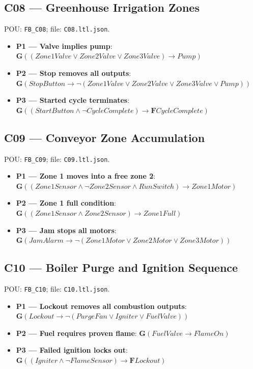 \subsection*{C08 --- Greenhouse Irrigation Zones}
\noindent POU: \texttt{FB\_C08}; file: \texttt{C08.ltl.json}.
\begin{small}
\begin{itemize}
\item \textbf{P1 --- Valve implies pump}: $\mathbf{G}((Zone1Valve \vee Zone2Valve \vee Zone3Valve) \rightarrow Pump)$
\item \textbf{P2 --- Stop removes all outputs}: $\mathbf{G}(StopButton \rightarrow \neg (Zone1Valve \vee Zone2Valve \vee Zone3Valve \vee Pump))$
\item \textbf{P3 --- Started cycle terminates}: $\mathbf{G}((StartButton \wedge \neg CycleComplete) \rightarrow \mathbf{F} CycleComplete)$
\end{itemize}
\end{small}

\subsection*{C09 --- Conveyor Zone Accumulation}
\noindent POU: \texttt{FB\_C09}; file: \texttt{C09.ltl.json}.
\begin{small}
\begin{itemize}
\item \textbf{P1 --- Zone 1 moves into a free zone 2}: $\mathbf{G}((Zone1Sensor \wedge \neg Zone2Sensor \wedge RunSwitch) \rightarrow Zone1Motor)$
\item \textbf{P2 --- Zone 1 full condition}: $\mathbf{G}((Zone1Sensor \wedge Zone2Sensor) \rightarrow Zone1Full)$
\item \textbf{P3 --- Jam stops all motors}: $\mathbf{G}(JamAlarm \rightarrow \neg (Zone1Motor \vee Zone2Motor \vee Zone3Motor))$
\end{itemize}
\end{small}

\subsection*{C10 --- Boiler Purge and Ignition Sequence}
\noindent POU: \texttt{FB\_C10}; file: \texttt{C10.ltl.json}.
\begin{small}
\begin{itemize}
\item \textbf{P1 --- Lockout removes all combustion outputs}: $\mathbf{G}(Lockout \rightarrow \neg (PurgeFan \vee Igniter \vee FuelValve))$
\item \textbf{P2 --- Fuel requires proven flame}: $\mathbf{G}(FuelValve \rightarrow FlameOn)$
\item \textbf{P3 --- Failed ignition locks out}: $\mathbf{G}((Igniter \wedge \neg FlameSensor) \rightarrow \mathbf{F} Lockout)$
\end{itemize}
\end{small}

